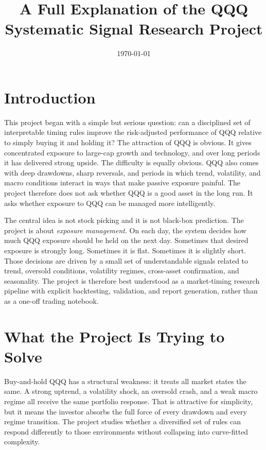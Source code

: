 \documentclass[11pt]{article}
\title{\textbf{A Full Explanation of the QQQ Systematic Signal Research Project}}
\author{}
\date{\today}
\begin{document}
\maketitle
\thispagestyle{empty}

\section*{Introduction}

This project began with a simple but serious question: can a disciplined set of
interpretable timing rules improve the risk-adjusted performance of QQQ relative
to simply buying it and holding it? The attraction of QQQ is obvious. It gives
concentrated exposure to large-cap growth and technology, and over long periods
it has delivered strong upside. The difficulty is equally obvious. QQQ also
comes with deep drawdowns, sharp reversals, and periods in which trend,
volatility, and macro conditions interact in ways that make passive exposure
painful. The project therefore does not ask whether QQQ is a good asset in the
long run. It asks whether exposure to QQQ can be managed more intelligently.

The central idea is not stock picking and it is not black-box prediction. The
project is about \emph{exposure management}. On each day, the system decides how
much QQQ exposure should be held on the next day. Sometimes that desired
exposure is strongly long. Sometimes it is flat. Sometimes it is slightly
short. Those decisions are driven by a small set of understandable signals
related to trend, oversold conditions, volatility regimes, cross-asset
confirmation, and seasonality. The project is therefore best understood as a
market-timing research pipeline with explicit backtesting, validation, and
report generation, rather than as a one-off trading notebook.

\section*{What the Project Is Trying to Solve}

Buy-and-hold QQQ has a structural weakness: it treats all market states the
same. A strong uptrend, a volatility shock, an oversold crash, and a weak
macro regime all receive the same portfolio response. That is attractive for
simplicity, but it means the investor absorbs the full force of every drawdown
and every regime transition. The project studies whether a diversified set of
rules can respond differently to those environments without collapsing into
curve-fitted complexity.
\end{document}
